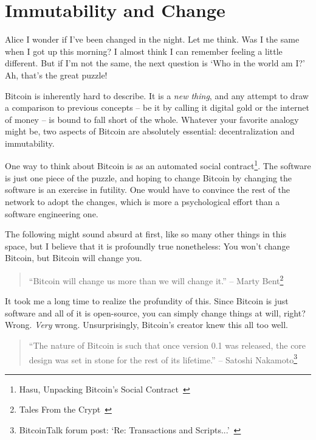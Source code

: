 \chapter{Immutability and Change}
\label{les:1}

\begin{chapquote}{Alice}
I wonder if I've been changed in the night. Let me think. Was I the same when I
got up this morning? I almost think I can remember feeling a little different.
But if I'm not the same, the next question is `Who in the world am I?' Ah,
that's the great puzzle!
\end{chapquote}

Bitcoin is inherently hard to describe. It is a \textit{new thing}, and any
attempt to draw a comparison to previous concepts -- be it by calling
it digital gold or the internet of money -- is bound to fall short of
the whole. Whatever your favorite analogy might be, two aspects of
Bitcoin are absolutely essential: decentralization and immutability.

One way to think about Bitcoin is as an automated social contract\footnote{Hasu,
Unpacking Bitcoin's Social Contract~\cite{social-contract}}. The software is
just one piece of the puzzle, and hoping to change Bitcoin by changing the
software is an exercise in futility. One would have to convince the rest of the
network to adopt the changes, which is more a psychological effort than a
software engineering one.

The following might sound absurd at first, like so many other things in
this space, but I believe that it is profoundly true nonetheless: You
won't change Bitcoin, but Bitcoin will change you.

\begin{quotation}
``Bitcoin will change us more than we will change it.''
\flushright -- Marty Bent\footnote{Tales From the Crypt~\cite{tftc21}}
\end{quotation}

It took me a long time to realize the profundity of this. Since Bitcoin
is just software and all of it is open-source, you can simply change
things at will, right? Wrong. \textit{Very} wrong. Unsurprisingly, Bitcoin's
creator knew this all too well.

\begin{quotation}
``The nature of Bitcoin is such that once version 0.1 was released, the core
design was set in stone for the rest of its lifetime.''
\flushright -- Satoshi Nakamoto\footnote{BitcoinTalk forum post: `Re:
Transactions and Scripts...'~\cite{satoshi-set-in-stone}}
\end{quotation}

